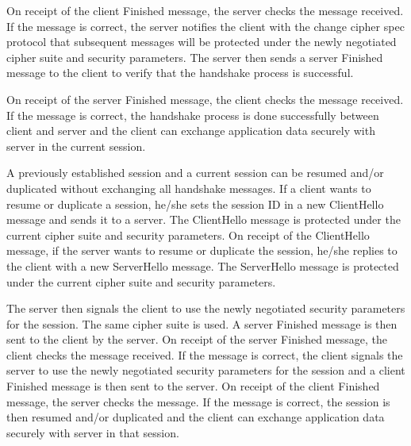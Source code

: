 \documentclass[a4paper,fleqn]{cas-dc}
\begin{document}
On receipt of the client Finished message, the server
checks the message received. If the message is correct, the server notifies the client with the change cipher spec protocol that subsequent messages will be protected under the newly negotiated cipher suite and security parameters. The server then sends a server Finished message to the client to verify that the handshake process is successful.

On receipt of the server Finished message, the client
checks the message received. If the message is correct, the handshake process is done successfully between client and server and the client can exchange application data securely with server in the current session.

A previously established session and a current session
can be resumed and/or duplicated without exchanging all handshake messages. If a client wants to resume or duplicate a session, he/she sets the session ID in a new ClientHello message and sends it to a server. The ClientHello message is protected under the current cipher suite and security parameters. On receipt of the ClientHello message, if the server wants to resume or duplicate the session, he/she replies to the client with a new ServerHello message. The ServerHello message is protected under the current cipher suite and security parameters. 

The server then signals the client to use the newly negotiated security parameters for the session. The same cipher suite is used. A server Finished message is then sent to the client by the server. On receipt of the server Finished message, the client checks the message received. If the message is correct, the client signals the server to use the newly negotiated security parameters for the session and a client Finished message is then sent to the server. On receipt of the client Finished message, the server checks the message. If the message is correct, the session is then resumed and/or duplicated and the client can exchange application data securely with server in that session.
\end{document}
